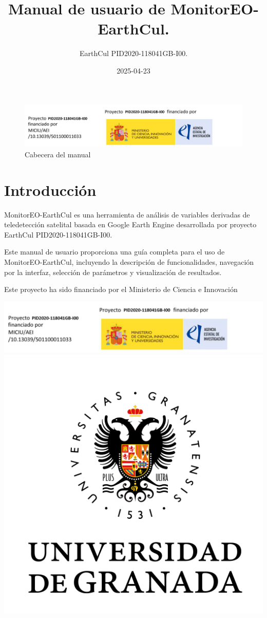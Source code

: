 \documentclass[
]{book}
\title{Manual de usuario de MonitorEO-EarthCul.}
\author{EarthCul PID2020-118041GB-I00.}
\date{2025-04-23}
\begin{document}
\maketitle

{
\setcounter{tocdepth}{1}
\tableofcontents
}
\begin{figure}
\centering
\includegraphics{assets/logoe.png}
\caption{Cabecera del manual}
\end{figure}

\chapter{Introducción}\label{intro}

MonitorEO-EarthCul es una herramienta de análisis de variables derivadas de teledetección satelital basada en Google Earth Engine desarrollada por proyecto EarthCul PID2020-118041GB-I00.

Este manual de usuario proporciona una guía completa para el uso de MonitorEO-EarthCul, incluyendo la descripción de funcionalidades, navegación por la interfaz, selección de parámetros y visualización de resultados.

Este proyecto ha sido financiado por el Ministerio de Ciencia e Innovación

\includegraphics{assets/logoe.png}
\includegraphics{assets/logo-ugr.png}
\end{document}
